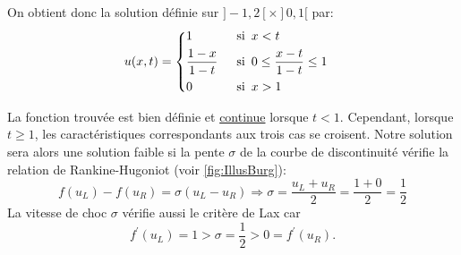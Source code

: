 \documentclass[
	french,
	11pt, %
]{fphw}
\newcommand{\hquad}{\hspace{0.5em}} %
\begin{document}
\noindent On obtient donc la solution définie sur $]-1,2[ \times ]0,1[ $ par:
\begin{align*}
	u(x, t) &= 
	\begin{dcases}
		1 \hquad & \text{si} \hquad x<t \\	
		\frac{1-x}{1-t} \hquad & \text{si} \hquad 0 \leq \frac{x-t}{1-t} \leq 1 \\	
		0 \hquad & \text{si} \hquad x>1
	\end{dcases}
\end{align*}


\noindent La fonction trouvée est bien définie et \underline{continue} lorsque $ t<1$. Cependant, lorsque $t \geq 1$, les caractéristiques correspondants aux trois cas se croisent. Notre solution sera alors une solution faible si la pente $\sigma$ de la courbe de discontinuité vérifie la relation de Rankine-Hugoniot (voir \cref{fig:IllusBurg}): 
$$
f(u_L) - f(u_R) = \sigma (u_L - u_R) \Longrightarrow \sigma = \frac{u_L + u_R}{2} = \frac{1 + 0}{2} = \frac{1}{2}
$$
La vitesse de choc $\sigma$ vérifie aussi le critère de Lax car $$f^\prime(u_{L}) = 1 > \sigma = \frac{1}{2} > 0 = f^\prime(u_{R}).$$
\end{document}
